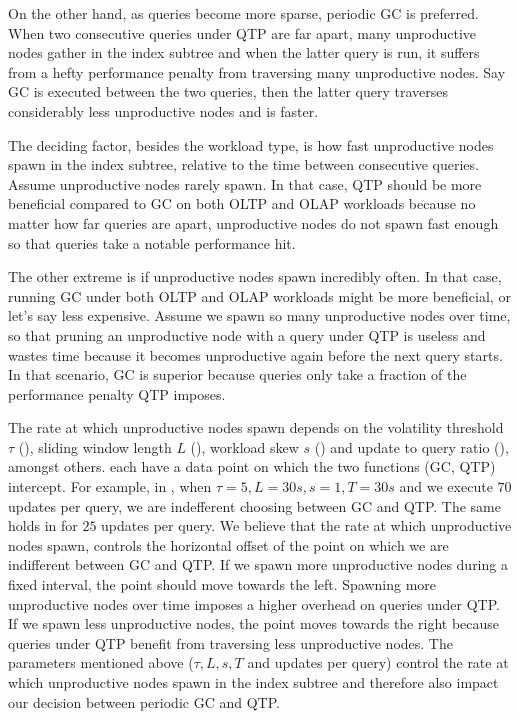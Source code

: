 \documentclass[abstracton,12pt]{scrartcl}
\theoremstyle{definition}
\begin{document}
On the other hand, as queries become more sparse, periodic GC is preferred.
When two consecutive queries under QTP are far apart, many unproductive nodes
gather in the index subtree and when the latter query is run, it
suffers from a hefty performance penalty from traversing many unproductive nodes.
Say GC is executed between the two queries, then the latter query traverses
considerably less unproductive nodes and is faster.

The deciding factor, besides the workload type, is how fast unproductive nodes
spawn in the index subtree, relative to the time between consecutive
queries. Assume unproductive nodes rarely spawn. In that case, QTP
should be more beneficial compared to GC on both OLTP and OLAP workloads
because no matter how far queries are apart, unproductive nodes do
not spawn fast enough so that queries take a notable performance hit.

The other extreme is if unproductive nodes spawn incredibly often.
In that case, running GC under both OLTP and OLAP workloads
might be more beneficial, or let's say less expensive.
Assume we spawn so many unproductive nodes over time, so that
pruning an unproductive node with a query under QTP is useless
and wastes time because it becomes unproductive again before
the next query starts. In that scenario, GC is superior because
queries only take a fraction of the performance penalty QTP imposes.

The rate at which unproductive nodes spawn depends on the volatility
threshold $\tau$ (), sliding window length $L$
(), workload skew $s$ () and
update to query ratio (), amongst others.
 each have a data point
on which the two functions (GC, QTP) intercept. For example, in
, when $\tau = 5, L = 30s, s = 1, T = 30s$ and
we execute $70$ updates per query, we are indefferent choosing between GC
and QTP. The same holds in  for $25$ updates
per query. We believe that the rate at which unproductive nodes spawn,
controls the horizontal offset of the point on which we are indifferent
between GC and QTP. If we spawn more unproductive nodes during a fixed
interval, the point should move towards the left. Spawning more unproductive
nodes over time imposes a higher overhead on queries under QTP.
If we spawn less unproductive nodes, the point moves towards the right
because queries under QTP benefit from traversing less unproductive nodes.
The parameters mentioned above ($\tau, L, s, T$ and updates per query) 
control the rate at which unproductive nodes
spawn in the index subtree and therefore also impact our decision between
periodic GC and QTP.
\end{document}
